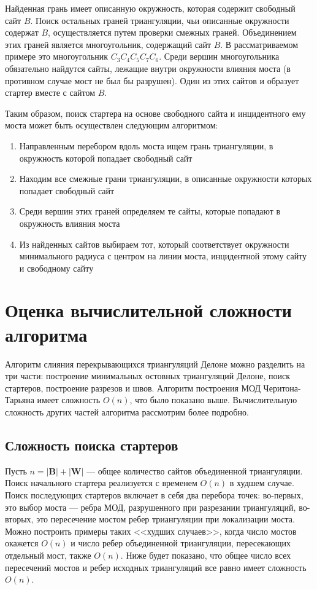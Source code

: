 \documentclass[12pt]{article}
\begin{document}
Найденная грань имеет описанную окружность, которая содержит свободный сайт $B$.
Поиск остальных граней триангуляции, чьи описанные окружности содержат $B$,
осуществляется путем проверки смежных граней.
Объединением этих граней является многоугольник, содержащий сайт $B$.
В рассматриваемом примере это многоугольник $C_3C_4C_5C_7C_6$.
Среди вершин многоугольника обязательно найдутся сайты,
лежащие внутри окружности влияния моста (в противном случае мост не был бы разрушен).
Один из этих сайтов и образует стартер вместе с сайтом $B$.

Таким образом, поиск стартера на основе свободного сайта и инцидентного ему моста может быть осуществлен следующим алгоритмом:

\begin{enumerate}
	\item Направленным перебором вдоль моста ищем грань триангуляции, в окружность которой попадает свободный сайт
	\item Находим все смежные грани триангуляции, в описанные окружности которых попадает свободный сайт
	\item Среди вершин этих граней определяем те сайты, которые попадают в окружность влияния моста
	\item Из найденных сайтов выбираем тот, который соответствует окружности минимального радиуса с центром на линии моста,
		инцидентной этому сайту и свободному сайту
\end{enumerate}

\section{Оценка вычислительной сложности алгоритма}
Алгоритм слияния перекрывающихся триангуляций Делоне можно разделить на три части:
построение минимальных остовных триангуляций Делоне,
поиск стартеров, построение разрезов и швов.
Алгоритм построения МОД Черитона-Тарьяна имеет сложность $O(n)$, что было показано выше.
Вычислительную сложность других частей алгоритма рассмотрим более подробно.

\subsection{Сложность поиска стартеров}
Пусть $n = |\textbf{B}| + |\textbf{W}|$ --- общее количество сайтов объединенной триангуляции.
Поиск начального стартера реализуется с временем $O(n)$ в худшем случае.
Поиск последующих стартеров включает в себя два перебора точек:
во-первых, это выбор моста –-- ребра МОД, разрушенного при разрезании триангуляций,
во-вторых, это пересечение мостом ребер триангуляции при локализации моста.
Можно построить примеры таких <<худших случаев>>, когда число мостов окажется $O(n)$ и
число ребер объединенной триангуляции, пересекающих отдельный мост, также $O(n)$.
Ниже будет показано, что общее число всех пересечений мостов и ребер исходных триангуляций все равно имеет сложность $O(n)$.
\end{document}
